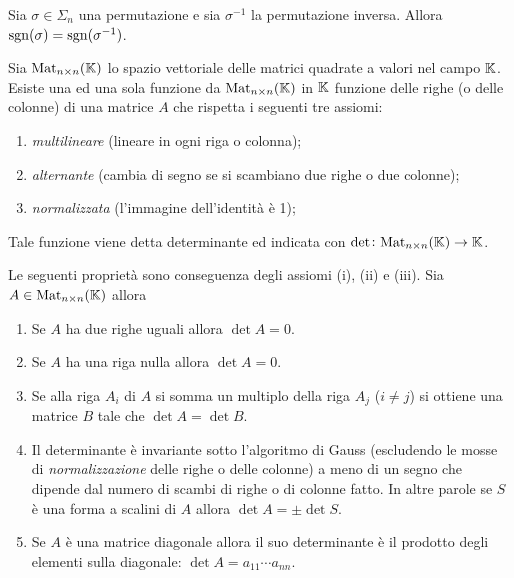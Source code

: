 \begin{prop}
	Sia $ \sigma \in \Sigma_n $ una permutazione e sia $ \sigma^{-1} $ la permutazione inversa. Allora $ \operatorname{sgn}(\sigma) = \operatorname{sgn}(\sigma^{-1}) $. 
\end{prop}

\begin{thm}
	Sia $ \mathrm{Mat}_{n \times n} (\mathbb{K}) $  lo spazio vettoriale delle matrici quadrate  a valori nel campo $ \mathbb{K} $. Esiste una ed una sola funzione da $ \mathrm{Mat}_{n \times n} (\mathbb{K}) $ in $ \mathbb{K} $ funzione delle righe (o delle colonne) di una matrice $ A $ che rispetta i seguenti tre assiomi:  
	\begin{enumerate}[label = (\roman*)]
		\item \emph{multilineare} (lineare in ogni riga o colonna);
		\item \emph{alternante} (cambia di segno se si scambiano due righe o due colonne);
		\item \emph{normalizzata} (l'immagine dell'identità è 1);
	\end{enumerate}
	Tale funzione viene detta determinante ed indicata con $ \det \colon \mathrm{Mat}_{n \times n} (\mathbb{K}) \to \mathbb{K} $. 
\end{thm}

\begin{propriety} \label{prop:det}
	Le seguenti proprietà sono conseguenza degli assiomi (i), (ii) e (iii). Sia $ A \in \mathrm{Mat}_{n \times n} (\mathbb{K}) $ allora
	\begin{enumerate}[label = (\arabic*)]
		\item Se $ A $ ha due righe uguali allora $ \det{A} = 0 $.
		\item Se $ A $ ha una riga nulla allora $ \det{A} = 0 $.
		\item Se alla riga $ A_i $ di $ A $ si somma un multiplo della riga $ A_j $ ($ i \neq j $) si ottiene una matrice $ B $ tale che $ \det A = \det B $. 
		\item Il determinante è invariante sotto l'algoritmo di Gauss (escludendo le mosse di \emph{normalizzazione} delle righe o delle colonne) a meno di un segno che dipende dal numero di scambi di righe o di colonne fatto. In altre parole se $ S $ è una forma a scalini di $ A $ allora $ \det A = \pm \det S $.
		\item Se $ A $ è una matrice diagonale allora il suo determinante è il prodotto degli elementi sulla diagonale: $ \det A = a_{11} \cdots a_{nn} $. 
	\end{enumerate}
\end{propriety}

